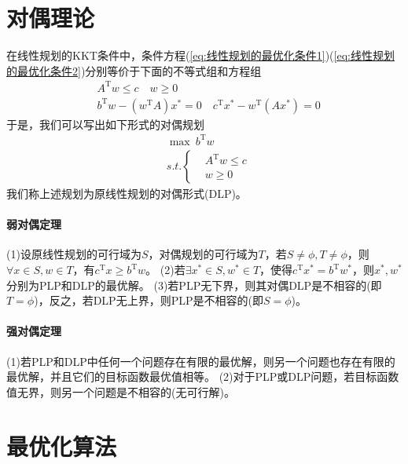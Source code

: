 \section{对偶理论}
    \par
    在线性规划的KKT条件中，条件方程(\ref{eq:线性规划的最优化条件1})(\ref{eq:线性规划的最优化条件2})分别等价于下面的不等式组和方程组
    \begin{align*}
    &A^\mathrm{T} w \leqslant c \quad w \geqslant 0 \\
    &b^\mathrm{T} w - (w^\mathrm{T} A)x^*=0 \quad c^\mathrm{T} x^*- w^\mathrm{T} (Ax^*)=0
    \end{align*}
    于是，我们可以写出如下形式的对偶规划
    \begin{align*}
    & \mathop {\max}\  b^\mathrm{T} w\\
    & s.t.\left\{
    \begin{aligned}
    & A^\mathrm{T} w \leqslant c\\
    & w \geqslant 0
    \end{aligned}
    \right.
    \end{align*}
    我们称上述规划为原线性规划的对偶形式(DLP)。
    \paragraph{弱对偶定理}
    (1)设原线性规划的可行域为$S$，对偶规划的可行域为$T$，若$S \neq \phi,T \neq \phi$，则$\forall  x \in S,w \in T$，有$c^\mathrm{T} x \geqslant b^\mathrm{T} w$。
    (2)若$\exists x^* \in S,w^* \in T$，使得$c^\mathrm{T} x^*=b^\mathrm{T} w^*$，则$x^*,w^*$分别为PLP和DLP的最优解。
    (3)若PLP无下界，则其对偶DLP是不相容的(即$T=\phi$)，反之，若DLP无上界，则PLP是不相容的(即$S=\phi$)。
    \paragraph{强对偶定理}
    (1)若PLP和DLP中任何一个问题存在有限的最优解，则另一个问题也存在有限的最优解，并且它们的目标函数最优值相等。
    (2)对于PLP或DLP问题，若目标函数值无界，则另一个问题是不相容的(无可行解)。
\section{最优化算法}
